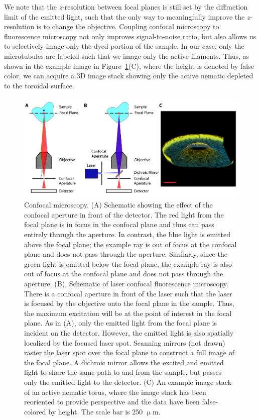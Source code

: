 We note that the $z$-resolution between focal planes is still set by the diffraction limit of the emitted light, such that the only way to meaningfully improve the $z$-resolution is to change the objective.
Coupling confocal microscopy to fluorescence microscopy not only improves signal-to-noise ratio, but also allows us to selectively image only the dyed portion of the sample.
In our case, only the microtubules are labeled such that we image only the active filaments.
Thus, as shown in the example image in Figure~\ref{f:3-Confocal}(C), where the height is denoted by false color, we can acquire a 3D image stack showing only the active nematic depleted to the toroidal surface.
\begin{figure}
  \centering
  \includegraphics{figures/C3/Ch3-Figs_Confocal.png}
  \caption{Confocal microscopy.
  (A) Schematic showing the effect of the confocal aperture in front of the detector.
  The red light from the focal plane is in focus in the confocal plane and thus can pass entirely through the aperture.
  In contrast, the blue light is emitted above the focal plane; the example ray is out of focus at the confocal plane and does not pass through the aperture.
  Similarly, since the green light is emitted below the focal plane, the example ray is also out of focus at the confocal plane and does not pass through the aperture.
  (B), Schematic of laser confocal fluorescence microscopy.
  There is a confocal aperture in front of the laser such that the laser is focused by the objective onto the focal plane in the sample.
  Thus, the maximum excitation will be at the point of interest in the focal plane.
  As in (A), only the emitted light from the focal plane is incident on the detector.
  However, the emitted light is also spatially localized by the focused laser spot.
  Scanning mirrors (not drawn) raster the laser spot over the focal plane to construct a full image of the focal plane.
  A dichroic mirror allows the excited and emitted light to share the same path to and from the sample, but passes only the emitted light to the detector.
  (C) An example image stack of an active nematic torus, where the image stack has been reoriented to provide perspective and the data have been false-colored by height.
  The scale bar is 250 $\upmu$m.}\label{f:3-Confocal}
\end{figure}

